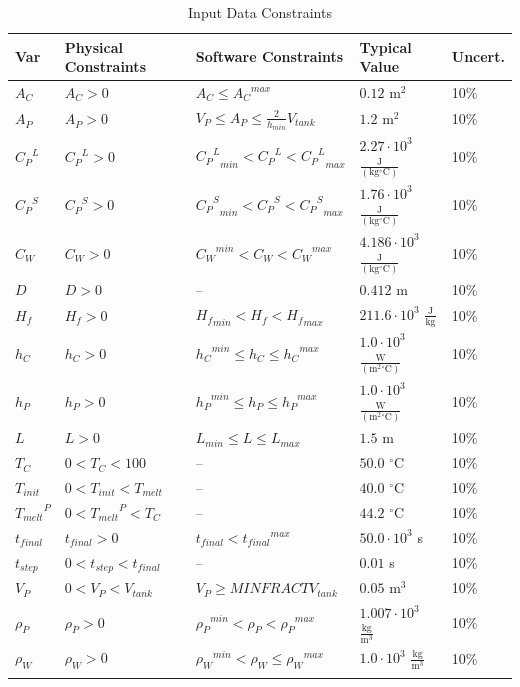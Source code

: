 \documentclass[12pt]{article}
\begin{document}
\begin{longtable}{l l l l l}
\toprule
\textbf{Var} & \textbf{Physical Constraints} & \textbf{Software Constraints} & \textbf{Typical Value} & \textbf{Uncert.}
\\
\midrule
\endhead
${A_{C}}$ & ${A_{C}}>0$ & ${A_{C}}\leq{}{{A_{C}}^{max}}$ & $0.12$ $\text{m}^{2}$ & 10$\%$
\\
${A_{P}}$ & ${A_{P}}>0$ & ${V_{P}}\leq{}{A_{P}}\leq{}\frac{2}{{h_{min}}} {V_{tank}}$ & $1.2$ $\text{m}^{2}$ & 10$\%$
\\
${{C_{P}}^{L}}$ & ${{C_{P}}^{L}}>0$ & ${{{C_{P}}^{L}}_{min}}<{{C_{P}}^{L}}<{{{C_{P}}^{L}}_{max}}$ & $2.27\cdot{}10^{3}$ $\frac{\text{J}}{(\text{kg}{}^{\circ}\text{C})}$ & 10$\%$
\\
${{C_{P}}^{S}}$ & ${{C_{P}}^{S}}>0$ & ${{{C_{P}}^{S}}_{min}}<{{C_{P}}^{S}}<{{{C_{P}}^{S}}_{max}}$ & $1.76\cdot{}10^{3}$ $\frac{\text{J}}{(\text{kg}{}^{\circ}\text{C})}$ & 10$\%$
\\
${C_{W}}$ & ${C_{W}}>0$ & ${{C_{W}}^{min}}<{C_{W}}<{{C_{W}}^{max}}$ & $4.186\cdot{}10^{3}$ $\frac{\text{J}}{(\text{kg}{}^{\circ}\text{C})}$ & 10$\%$
\\
$D$ & $D>0$ & -- & $0.412$ m & 10$\%$
\\
${H_{f}}$ & ${H_{f}}>0$ & ${{H_{f}}_{min}}<{H_{f}}<{{H_{f}}_{max}}$ & $211.6\cdot{}10^{3}$ $\frac{\text{J}}{\text{kg}}$ & 10$\%$
\\
${h_{C}}$ & ${h_{C}}>0$ & ${{h_{C}}^{min}}\leq{}{h_{C}}\leq{}{{h_{C}}^{max}}$ & $1.0\cdot{}10^{3}$ $\frac{\text{W}}{(\text{m}^{2}{}^{\circ}\text{C})}$ & 10$\%$
\\
${h_{P}}$ & ${h_{P}}>0$ & ${{h_{P}}^{min}}\leq{}{h_{P}}\leq{}{{h_{P}}^{max}}$ & $1.0\cdot{}10^{3}$ $\frac{\text{W}}{(\text{m}^{2}{}^{\circ}\text{C})}$ & 10$\%$
\\
$L$ & $L>0$ & ${L_{min}}\leq{}L\leq{}{L_{max}}$ & $1.5$ m & 10$\%$
\\
${T_{C}}$ & $0<{T_{C}}<100$ & -- & $50.0$ ${}^{\circ}$C & 10$\%$
\\
${T_{init}}$ & $0<{T_{init}}<{T_{melt}}$ & -- & $40.0$ ${}^{\circ}$C & 10$\%$
\\
${{T_{melt}}^{P}}$ & $0<{{T_{melt}}^{P}}<{T_{C}}$ & -- & $44.2$ ${}^{\circ}$C & 10$\%$
\\
${t_{final}}$ & ${t_{final}}>0$ & ${t_{final}}<{{t_{final}}^{max}}$ & $50.0\cdot{}10^{3}$ s & 10$\%$
\\
${t_{step}}$ & $0<{t_{step}}<{t_{final}}$ & -- & $0.01$ s & 10$\%$
\\
${V_{P}}$ & $0<{V_{P}}<{V_{tank}}$ & ${V_{P}}\geq{}MINFRACT {V_{tank}}$ & $0.05$ $\text{m}^{3}$ & 10$\%$
\\
${ρ_{P}}$ & ${ρ_{P}}>0$ & ${{ρ_{P}}^{min}}<{ρ_{P}}<{{ρ_{P}}^{max}}$ & $1.007\cdot{}10^{3}$ $\frac{\text{kg}}{\text{m}^{3}}$ & 10$\%$
\\
${ρ_{W}}$ & ${ρ_{W}}>0$ & ${{ρ_{W}}^{min}}<{ρ_{W}}\leq{}{{ρ_{W}}^{max}}$ & $1.0\cdot{}10^{3}$ $\frac{\text{kg}}{\text{m}^{3}}$ & 10$\%$
\\
\bottomrule
\caption{Input Data Constraints}
\label{Table:InDataConstraints}
\end{longtable}
\end{document}
